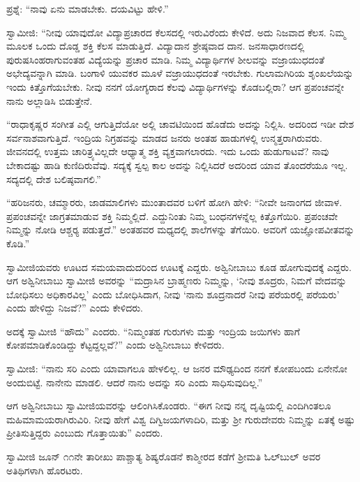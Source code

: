  ಪ್ರಶ್ನೆ: “ನಾವು ಏನು ಮಾಡಬೇಕು. ದಯವಿಟ್ಟು ಹೇಳಿ.” 

 ಸ್ವಾಮೀಜಿ: “ನೀವು ಯಾವುದೋ ವಿದ್ಯಾಪ್ರಚಾರದ ಕೆಲಸದಲ್ಲಿ ಇರುವಿರೆಂದು ಕೇಳಿದೆ. ಅದು ನಿಜವಾದ ಕೆಲಸ. ನಿಮ್ಮ ಮೂಲಕ ಒಂದು ದೊಡ್ಡ ಶಕ್ತಿ ಕೆಲಸ ಮಾಡುತ್ತಿದೆ. ವಿದ್ಯಾದಾನ ಶ್ರೇಷ್ಠವಾದ ದಾನ. ಜನಸಾಧಾರಣದಲ್ಲಿ ಪುರುಷಸಿಂಹರಾಗುವಂತಹ ವಿದ್ಯೆಯನ್ನು ಪ್ರಚಾರ ಮಾಡಿ. ನಿಮ್ಮ ವಿದ್ಯಾರ್ಥಿಗಳ ಶೀಲವನ್ನು ವಜ್ರಾಯುಧದಂತೆ ಅಭೇದ್ಯವನ್ನಾಗಿ ಮಾಡಿ. ಬಂಗಾಳಿ ಯುವಕರ ಮೂಳೆ ವಜ್ರಾಯುಧದಂತೆ ಇರಬೇಕು. ಗುಲಾಮಗಿರಿಯ ಶೃಂಖಲೆಯನ್ನು ಇಂದು ಕಿತ್ತೊಗೆಯಬೇಕು. ನೀವು ನನಗೆ ಯೋಗ್ಯರಾದ ಕೆಲವು ವಿದ್ಯಾರ್ಥಿಗಳನ್ನು ಕೊಡಬಲ್ಲಿರಾ? ಆಗ ಪ್ರಪಂಚವನ್ನೇ ನಾನು ಅಲ್ಲಾಡಿಸಿ ಬಿಡುತ್ತೇನೆ. 

 “ರಾಧಾಕೃಷ್ಣರ ಸಂಗೀತ ಎಲ್ಲಿ ಆಗುತ್ತಿದೆಯೋ ಅಲ್ಲಿ ಚಾವಟಿಯಿಂದ ಹೊಡೆದು ಅದನ್ನು ನಿಲ್ಲಿಸಿ. ಅದರಿಂದ ಇಡೀ ದೇಶ ಸರ್ವನಾಶವಾಗುತ್ತಿದೆ. ಇಂದ್ರಿಯ ನಿಗ್ರಹವನ್ನು ಮಾಡದ ಜನರು ಅಂತಹ ಹಾಡುಗಳಲ್ಲಿ ಉನ್ಮತ್ತರಾಗಿರುವರು. ಜೀವನದಲ್ಲಿ ಉತ್ತಮ ಚಾರಿತ್ರ್ಯವಿಲ್ಲದೇ ಆಧ್ಯಾತ್ಮ ಶಕ್ತಿ ವ್ಯಕ್ತವಾಗಲಾರದು. ಇದು ಒಂದು ಹುಡುಗಾಟವೆ? ನಾವು ಬೇಕಾದಷ್ಟು ಹಾಡಿ ಕುಣಿದಿರುವೆವು. ಸದ್ಯಕ್ಕೆ ಸ್ವಲ್ಪ ಕಾಲ ಅದನ್ನು ನಿಲ್ಲಿಸಿದರೆ ಅದರಿಂದ ಯಾವ ತೊಂದರೆಯೂ ಇಲ್ಲ. ಸದ್ಯದಲ್ಲಿ ದೇಶ ಬಲಿಷ್ಠವಾಗಲಿ.” 

 “ಹರಿಜನರು, ಚಮ್ಮಾರರು, ಜಾಡಮಾಲಿಗಳು ಮುಂತಾದವರ ಬಳಿಗೆ ಹೋಗಿ ಹೇಳಿ: “ನೀವೇ ಜನಾಂಗದ ಜೀವಾಳ. ಪ್ರಪಂಚವನ್ನೇ ಜಾಗ್ರತಮಾಡುವ ಶಕ್ತಿ ನಿಮ್ಮಲ್ಲಿದೆ. ಎದ್ದುನಿಂತು ನಿಮ್ಮ ಬಂಧನಗಳನ್ನೆಲ್ಲ ಕಿತ್ತೊಗೆಯಿರಿ. ಪ್ರಪಂಚವೇ ನಿಮ್ಮನ್ನು ನೋಡಿ ಆಶ್ಚರ‍್ಯ ಪಡುತ್ತದೆ.” ಅಂತಹವರ ಮಧ್ಯದಲ್ಲಿ ಶಾಲೆಗಳನ್ನು ತೆಗೆಯಿರಿ. ಅವರಿಗೆ ಯಜ್ಞೋಪವೀತವನ್ನು ಕೊಡಿ.” 

 ಸ್ವಾಮೀಜಿಯವರು ಊಟದ ಸಮಯವಾದುದರಿಂದ ಊಟಕ್ಕೆ ಎದ್ದರು. ಅಶ್ವಿನೀಬಾಬು ಕೂಡ ಹೋಗುವುದಕ್ಕೆ ಎದ್ದರು. ಆಗ ಅಶ್ವಿನೀಬಾಬು ಸ್ವಾಮೀಜಿ ಅವರನ್ನು “ಮದ್ರಾಸಿನ ಬ್ರಾಹ್ಮಣರು ನಿಮ್ಮನ್ನು, ‘ನೀವು ಶೂದ್ರರು, ನಿಮಗೆ ವೇದವನ್ನು ಬೋಧಿಸಲು ಅಧಿಕಾರವಿಲ್ಲ’ ಎಂದು ಬೋಧಿಸಿದಾಗ, ನೀವು ‘ನಾನು ಶೂದ್ರನಾದರೆ ನೀವು ಪರೆಯರಲ್ಲಿ ಪರೆಯರು’ ಎಂದು ಹೇಳಿದ್ದು ನಿಜವೆ?” ಎಂದು ಕೇಳಿದರು. 

 ಅದಕ್ಕೆ ಸ್ವಾಮೀಜಿ “ಹೌದು” ಎಂದರು. “ನಿಮ್ಮಂತಹ ಗುರುಗಳು ಮತ್ತು ಇಂದ್ರಿಯ ಜಯಿಗಳು ಹಾಗೆ ಕೋಪಮಾಡಿಕೊಂಡಿದ್ದು ಕೆಟ್ಟದ್ದಲ್ಲವೆ?” ಎಂದು ಅಶ್ವಿನೀಬಾಬು ಕೇಳಿದರು. 

 ಸ್ವಾಮೀಜಿ: “ನಾನು ಸರಿ ಎಂದು ಯಾವಾಗಲೂ ಹೇಳಲಿಲ್ಲ. ಆ ಜನರ ಮೌಢ್ಯದಿಂದ ನನಗೆ ಕೋಪಬಂದು ಏನೇನೋ ಅಂದುಬಿಟ್ಟೆ. ನಾನೇನು ಮಾಡಲಿ. ಆದರೆ ನಾನು ಅದನ್ನು ಸರಿ ಎಂದು ಸಾಧಿಸುವುದಿಲ್ಲ.” 

 ಆಗ ಅಶ್ವಿನೀಬಾಬು ಸ್ವಾಮೀಜಿಯವರನ್ನು ಆಲಿಂಗಿಸಿಕೊಂಡರು. “ಈಗ ನೀವು ನನ್ನ ದೃಷ್ಟಿಯಲ್ಲಿ ಎಂದಿಗಿಂತಲೂ ಮಹಿಮಾಮಯರಾಗಿರುವಿರಿ. ನೀವು ಹೇಗೆ ವಿಶ್ವ ದಿಗ್ವಿಜಯಗಳಾದಿರಿ, ಮತ್ತು ಶ‍್ರೀ ಗುರುದೇವರು ನಿಮ್ಮನ್ನು ಏತಕ್ಕೆ ಅಷ್ಟು ಪ್ರೀತಿಸುತ್ತಿದ್ದರು ಎಂಬುದು ಗೊತ್ತಾಯಿತು” ಎಂದರು. 

 ಸ್ವಾಮೀಜಿ ಜೂನ್ ೧೧ನೇ ತಾರೀಖು ಪಾಶ್ಚಾತ್ಯ ಶಿಷ್ಯರೊಡನೆ ಕಾಶ್ಮೀರದ ಕಡೆಗೆ ಶ‍್ರೀಮತಿ ಓಲ್‍ಬುಲ್ ಅವರ ಅತಿಥಿಗಳಾಗಿ ಹೊರಟರು. 

